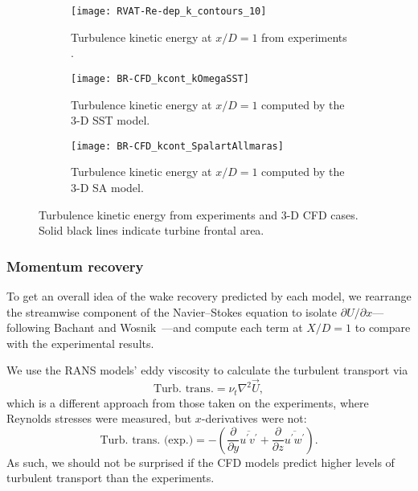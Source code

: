 \begin{figure}
    \centering
    \begin{subfigure}[b]{\textwidth}
        \centering

        \texttt{[image: RVAT-Re-dep\_k\_contours\_10]}

        \caption{Turbulence kinetic energy at $x/D=1$ from experiments
            \cite{Bachant2016-RVAT-Re-dep}.}

        \label{fig:kcont-exp}
    \end{subfigure}

    \begin{subfigure}[b]{\textwidth}
        \centering

        \texttt{[image: BR-CFD\_kcont\_kOmegaSST]}

        \caption{Turbulence kinetic energy at $x/D=1$ computed by the 3-D SST
            model.}

        \label{fig:kcont-SST}
    \end{subfigure}

    \begin{subfigure}[b]{\textwidth}
        \centering

        \texttt{[image: BR-CFD\_kcont\_SpalartAllmaras]}

        \caption{Turbulence kinetic energy at $x/D=1$ computed by the 3-D SA
            model.}

        \label{fig:kcont-SA}
    \end{subfigure}

    \caption{Turbulence kinetic energy from experiments and 3-D CFD cases. Solid
        black lines indicate turbine frontal area.}

    \label{fig:br-cfd-kcont}
\end{figure}


\subsubsection{Momentum recovery}

To get an overall idea of the wake recovery predicted by each model, we
rearrange the streamwise component of the Navier--Stokes equation to isolate
$\partial U / \partial x$---following Bachant and
Wosnik~\cite{Bachant2015-JoT}---and compute each term at $X/D = 1$ to compare
with the experimental results.

We use the RANS models' eddy viscosity to calculate the turbulent transport via
\begin{equation}
    \text{Turb. trans.} = \nu_t \nabla^2 \vec{U},
    \label{eq:turb-trans}
\end{equation}
which is a different approach from those taken on the experiments, where
Reynolds stresses were measured, but $x$-derivatives were not:
\begin{equation}
    \text{Turb. trans. (exp.)} =
    -\left(
    \frac{\partial}{\partial y} \overline{u^\prime v^\prime}
    +
    \frac{\partial}{\partial z} \overline{u^\prime w^\prime}
    \right).
\end{equation}
As such, we should not be surprised if the CFD models predict higher levels of
turbulent transport than the experiments.

